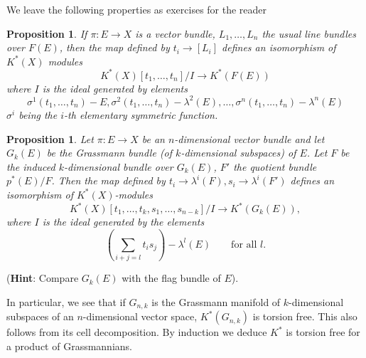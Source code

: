 \documentclass[leqno]{book}
\numberwithin{equation}{section}
\newtheorem{proposition}[theorem]{Proposition}
\theoremstyle{definition}
\renewcommand{\emph}{\textbf}
\begin{document}
            We leave the following properties as exercises for the reader

            \begin{proposition}
              If $\pi:E\to X $ is a vector bundle, $L_1, \ldots ,L_{n}$ the usual line bundles over $F(E)$, then the map defined by $t_{i}\to [L_{i}]$ defines an isomorphism of $K^{*}(X)$ modules
              \begin{equation*}
                K^{*}(X)[t_1, \ldots ,t_{n}]/I\to K^{*}(F(E))
              \end{equation*}
              where $I$ is the ideal generated by elements
              \begin{equation*}
                \sigma^{1}(t_1, \ldots ,t_{n})-E, \sigma^{2}(t_1, \ldots ,t_{n})-\lambda^{2}(E), \ldots ,\sigma^{n}(t_1, \ldots ,t_{n})-\lambda^{n}(E)
              \end{equation*}
              $\sigma^{i}$ being the $i$-th elementary symmetric function.
            \end{proposition}

            \begin{proposition}
              Let $\pi:E\to X$ be an $n$-dimensional vector bundle and let $G_{k}(E)$ be the Grassmann bundle (of $k$-dimensional subspaces) of $E$. Let $F$ be the induced $k$-dimensional bundle over $G_{k}(E)$, $F'$ the quotient bundle $p^{*}(E)/F$. Then the map defined by $t_{i}\to \lambda^{i}(F),s_{i}\to \lambda^{i}(F')$ defines an isomorphism of $K^{*}(X)$-modules
              \begin{equation*}
                K^{*}(X)[t_1, \ldots ,t_{k},s_1, \ldots ,s_{n-k}]/I\to K^{*}(G_{k}(E)),
              \end{equation*}
              where $I$ is the ideal generated by the elements
              \begin{equation*}
                \left(\sum_{i+j=l} t_{i}s_{j}\right)- \lambda^{l}(E)\qquad \text{for all } l.
              \end{equation*}
            \end{proposition}

            \noindent (\emph{Hint}: Compare $G_{k}(E)$ with the flag bundle of $E$).

            In particular, we see that if $G_{n,k}$ is the Grassmann manifold of $k$-dimensional subspaces of an $n$-dimensional vector space, $K^{*}(G_{n,k})$ is torsion free. This also follows from its cell decomposition. By induction we deduce $K^{*}$ is torsion free for a product of Grassmannians.
\end{document}
